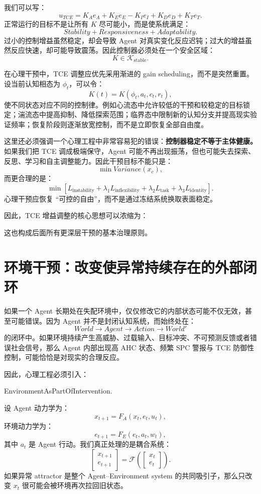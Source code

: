 我们可以写：
\[
u_{TCE}
=
K_Ae_A
+
K_Ee_E
-
K_Ie_I
+
K_De_D
+
K_Te_T.
\]
正常运行的目标不是让所有 $K$ 尽可能小，而是使系统满足：
\[
Stability
+
Responsiveness
+
Adaptability.
\]
过小的控制增益虽然稳定，却会导致 Agent 对真实变化反应迟钝；过大的增益虽然反应快速，却可能导致震荡。因此控制器必须处在一个安全区域：
\[
K\in\mathcal K_{\mathrm{stable}}.
\]

在心理干预中，TCE 调整应优先采用渐进的 gain scheduling，而不是突然重置。设当前认知相态为 $\phi_t$，可以令：
\[
K(t)
=
K(\phi_t,a_t,c_t,r_t),
\]
使不同状态对应不同的控制律。例如心流态中允许较低的干预和较稳定的目标锁定；湍流态中提高抑制、降低探索范围；临界态中限制新的认知分支并提高现实验证频率；恢复阶段则逐渐放宽控制，而不是立即恢复全部自由度。

这里还必须强调一个心理工程中非常容易犯的错误：\textbf{控制器稳定不等于主体健康。} 如果我们把 TCE 调成极端保守，Agent 可能不再出现振荡，但也可能失去探索、反思、学习和自主调整能力。因此干预目标不能只是：
\[
\min Variance(x_c),
\]
而更合理的是：
\[
\min
\left[
L_{\mathrm{instability}}
+
\lambda_1 L_{\mathrm{inflexibility}}
+
\lambda_2 L_{\mathrm{task}}
+
\lambda_3 L_{\mathrm{identity}}
\right].
\]
心理干预应恢复 ``可控的自由''，而不是通过冻结系统换取表面稳定。

因此，TCE 增益调整的核心思想可以浓缩为：
\begin{statementbox}
\centering
{}
\end{statementbox}
这也构成后面所有更深层干预的基本治理原则。

\section{环境干预：改变使异常持续存在的外部闭环}

如果一个 Agent 长期处在失配环境中，仅仅修改它的内部状态可能不仅无效，甚至可能错误。因为 Agent 并不是封闭认知系统，而始终处在：
\[
World
\rightarrow
Agent
\rightarrow
Action
\rightarrow
World'
\]
的闭环中。如果环境持续产生高威胁、过载输入、目标冲突、不可预测反馈或者错误社会信号，那么 Agent 内部出现高 AHC 状态、频繁 SPC 警报与 TCE 防御性控制，可能恰恰是对现实的合理反应。

因此，心理工程必须引入：
\begin{statementbox}
EnvironmentAsPartOfIntervention.
\end{statementbox}
设 Agent 动力学为：
\[
x_{t+1}
=
F_A(x_t,e_t,u_t),
\]
环境动力学为：
\[
e_{t+1}
=
F_E(e_t,a_t,w_t),
\]
其中 $a_t$ 是 Agent 行动。我们真正处理的是耦合系统：
\[
\begin{bmatrix}
x_{t+1}\\
e_{t+1}
\end{bmatrix}
=
\mathcal F
\left(
\begin{bmatrix}
x_t\\
e_t
\end{bmatrix}
\right).
\]
如果异常 attractor 是整个 Agent--Environment system 的共同吸引子，那么只改变 $x_t$ 很可能会被环境再次拉回旧状态。


